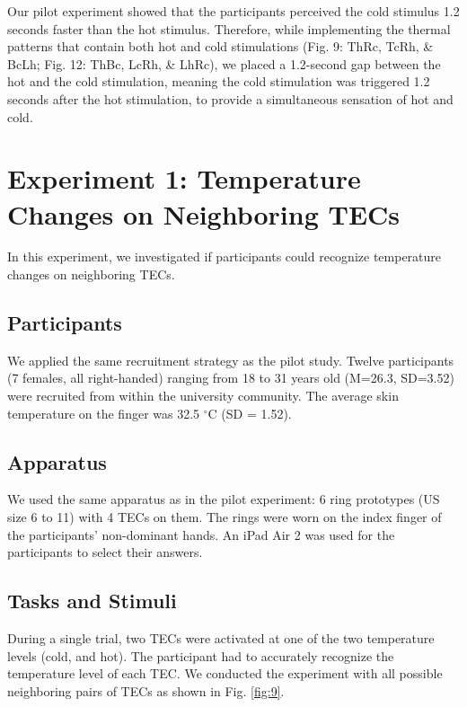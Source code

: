 \documentclass[preprint,12pt]{elsarticle}
\begin{document}
Our pilot experiment showed that the participants perceived the cold stimulus 1.2 seconds faster than the hot stimulus. Therefore, while implementing the thermal patterns that contain both hot and cold stimulations (Fig. 9: ThRc, TcRh, \& BcLh; Fig. 12: ThBc, LcRh, \& LhRc), we placed a 1.2-second gap between the hot and the cold stimulation, meaning the cold stimulation was triggered 1.2 seconds after the hot stimulation, to provide a simultaneous sensation of hot and cold.

\section{Experiment 1: Temperature Changes on Neighboring TECs}
In this experiment, we investigated if participants could recognize temperature changes on neighboring TECs.

\subsection{Participants}
We applied the same recruitment strategy as the pilot study. Twelve participants (7 females, all right-handed) ranging from 18 to 31 years old (M=26.3, SD=3.52) were recruited from within the university community. The average skin temperature on the finger was 32.5 $^{\circ}$C (SD = 1.52).

\subsection{Apparatus}
We used the same apparatus as in the pilot experiment: 6 ring prototypes (US size 6 to 11) with 4 TECs on them. The rings were worn on the index finger of the participants' non-dominant hands. An iPad Air 2 was used for the participants to select their answers.

\subsection{Tasks and Stimuli}
During a single trial, two TECs were activated at one of the two temperature levels (cold, and hot). The participant had to accurately recognize the temperature level of each TEC. We conducted the experiment with all possible neighboring pairs of TECs as shown in Fig. \ref{fig:9}.
\end{document}
